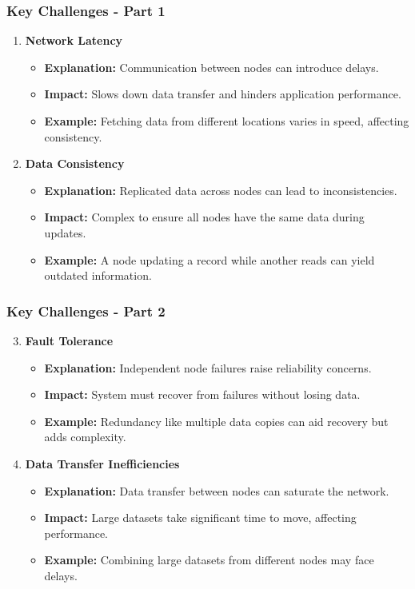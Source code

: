 \documentclass[aspectratio=169]{beamer}
\begin{document}
\begin{frame}[fragile]
    \frametitle{Key Challenges - Part 1}
    \begin{enumerate}
        \item \textbf{Network Latency}
            \begin{itemize}
                \item \textbf{Explanation:} Communication between nodes can introduce delays.
                \item \textbf{Impact:} Slows down data transfer and hinders application performance.
                \item \textbf{Example:} Fetching data from different locations varies in speed, affecting consistency.
            \end{itemize}
            
        \item \textbf{Data Consistency}
            \begin{itemize}
                \item \textbf{Explanation:} Replicated data across nodes can lead to inconsistencies.
                \item \textbf{Impact:} Complex to ensure all nodes have the same data during updates.
                \item \textbf{Example:} A node updating a record while another reads can yield outdated information.
            \end{itemize}
    \end{enumerate}
\end{frame}

\begin{frame}[fragile]
    \frametitle{Key Challenges - Part 2}
    \begin{enumerate}
        \setcounter{enumi}{2}
        \item \textbf{Fault Tolerance}
            \begin{itemize}
                \item \textbf{Explanation:} Independent node failures raise reliability concerns.
                \item \textbf{Impact:} System must recover from failures without losing data.
                \item \textbf{Example:} Redundancy like multiple data copies can aid recovery but adds complexity.
            \end{itemize}
        
        \item \textbf{Data Transfer Inefficiencies}
            \begin{itemize}
                \item \textbf{Explanation:} Data transfer between nodes can saturate the network.
                \item \textbf{Impact:} Large datasets take significant time to move, affecting performance.
                \item \textbf{Example:} Combining large datasets from different nodes may face delays.
            \end{itemize}
    \end{enumerate}
\end{frame}
\end{document}

